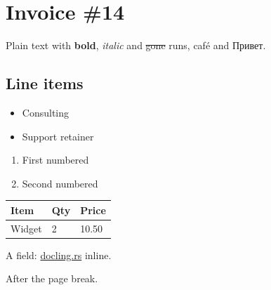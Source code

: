 \documentclass[11pt,a4paper]{article}
\begin{document}
\section{\textbf{Invoice \#14}}

Plain text with \textbf{bold}, \textit{italic} and \sout{gone} runs, café and Привет.

\subsection{Line items}

\begin{itemize}
\item Consulting
\item Support retainer
\end{itemize}

\begin{enumerate}
\item First numbered
\item Second numbered
\end{enumerate}

\begin{table}[h]
\begin{tabular}{|l|l|l|}
\hline
Item & Qty & \textbf{Price} \\ \hline
Widget & 2 & 10.50 \\ \hline
\end{tabular}
\end{table}

A field: \href{https://docling.rs/}{docling.rs} inline.

After the page break.
\end{document}
